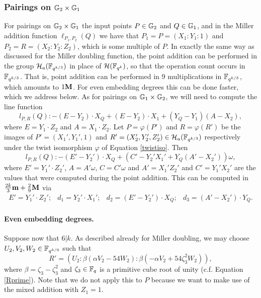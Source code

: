 \subsubsection{Pairings on $\mathbb{G}_{2} \times \mathbb{G}_{1}$}

For pairings on $\mathbb{G}_{2} \times \mathbb{G}_{1}$ the input points $P \in \mathbb{G}_{2}$ and $Q \in \mathbb{G}_{1}$, and in the Miller addition function $\ell_{P_1,P_2}(Q)$ we have that
$P_1 = P = (X_1:Y_1:1)$ and $P_2 = R = (X_2:Y_2:Z_2)$, which is some multiple of $P$. 
In exactly the same way as discussed for the Miller doubling function,
the point addition can be performed in the group $\mathcal{H}_a(\mathbb{F}_{q^{k/3}})$
in place of $\mathcal{H}(\mathbb{F}_{q^k})$, so that the operation count occurs in
$\mathbb{F}_{q^{k/3}}$. That is, point addition can be performed in 9 multiplications in 
$\mathbb{F}_{q^{k/3}}$, which amounts to $1\textbf{M}$. 
For even embedding degrees this can be done faster, which we address below.
As for pairings on $\mathbb{G}_{1} \times \mathbb{G}_{2}$, we will need to compute the line function
$$l_{P,R}(Q): - (E - Y_2) \cdot X_{Q} + (E - Y_2) \cdot X_1 + (Y_{Q}-Y_1)(A-X_2), $$
where $E = Y_1 \cdot Z_2$ and $A = X_1 \cdot Z_2$.
Let $P = \varphi(P')$ and $R = \varphi(R')$ be the images of 
$P' = (X_1',Y_1',1)$ and $R' = (X_2',Y_2',Z_2') \in \mathcal{H}_a(\mathbb{F}_{q^{k/3}})$ respectively
under the twist isomorphism $\varphi$ of Equation \eqref{twistiso}.
Then 
$$l_{P,R}(Q): - (E' - Y_2') \cdot X_{Q} + (C'-Y_2'X_1' + Y_Q(A'-X_2'))\omega, $$
where $E' = Y_1' \cdot Z_2'$, $A = A'\omega$, $C = C'\omega$ and 
$A' = X_1'Z_2'$ and $C' = Y_1'X_2'$ are the values that were computed during the point addition.
This can be computed in 
$\frac{2k}{3}\textbf{m} + \frac{2}{9}\textbf{M}$
via
\[\begin{array}{cccc}
E' = Y_1' \cdot Z_2'; &
d_1 = Y_2' \cdot X_1'; &
d_2 = (E' - Y_2') \cdot X_Q; &
d_3 = (A' - X_2')\cdot Y_Q.
\end{array}\]

\paragraph*{Even embedding degrees.}

Suppose now that $6 | k$.
As described already for Miller doubling, we may choose $U_2,V_2,W_2 \in \mathbb{F}_{q^{k/6}}$ such that
\[ R' = (U_2:\beta(\alpha V_2 - 54W_2) : \beta(-\alpha V_2 + 54\zeta_3^2 W_2)),
\]
where $\beta = \zeta_3-\zeta_3^2$ and 
$\zeta_3 \in \mathbb{F}_{q}$ is a primitive cube root of unity (c.f. Equation \eqref{Rprime}). 
Note that we do not apply this to $P$ because we want to make use of the mixed addition with $Z_1 = 1$.

